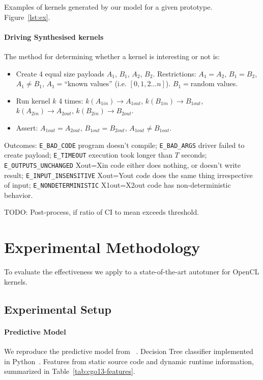 \documentclass[preprint,nonatbib,10pt,nocopyrightspace]{sigplanconf}
\begin{document}
Examples of kernels generated by our model for a given
prototype. Figure~\ref{lst:ex}.


\paragraph{Driving Synthesised kernels}

The method for determining whether a kernel is interesting or not is:

\begin{itemize}
\item Create 4 equal size payloads $A_1$, $B_1$, $A_2$, $B_2$.
  Restrictions: $A_1=A_2$, $B_1=B_2$, $A_1 \ne B_1$, $A_1 =$“known
  values” (i.e. $\left[0, 1, 2 \ldots n\right]$). $B_1=$random values.
\item Run kernel $k$ 4 times: $k(A_{1in}) \rightarrow A_{1out}$,
  $k(B_{1in}) \rightarrow B_{1out}$,
  $k(A_{2in}) \rightarrow A_{2out}$,
  $k(B_{2in}) \rightarrow B_{2out}$.
\item Assert: $A_{1out}=A_{2out}$, $B_{1out}=B_{2out}$,
  $A_{1out} \ne B_{1out}$.
\end{itemize}

Outcomes: \texttt{E\_BAD\_CODE} program doesn’t compile;
\texttt{E\_BAD\_ARGS} driver failed to create payload;
\texttt{E\_TIMEOUT} execution took longer than $T$ seconds;
\texttt{E\_OUTPUTS\_UNCHANGED} Xout=Xin code either does nothing, or
doesn’t write result; \texttt{E\_INPUT\_INSENSITIVE} Xout=Yout code
does the same thing irrespective of input;
\texttt{E\_NONDETERMINISTIC} X1out=X2out code has non-deterministic
behavior.


TODO: Post-process, if ratio of CI to mean exceeds threshold.


\section{Experimental Methodology}\label{sec:evaluation}

To evaluate the effectiveness we apply to a state-of-the-art autotuner
for OpenCL kernels.

\subsection{Experimental Setup}\label{subsec:}

\paragraph{Predictive Model} We reproduce the predictive model from
\citeauthor{Grewe2013}~\cite{Grewe2013}. Decision Tree classifier
implemented in Python~\cite{Pedregosa2012}. Features from static
source code and dynamic runtime information, summarized in
Table~\ref{tab:cgo13-features}.
\end{document}
